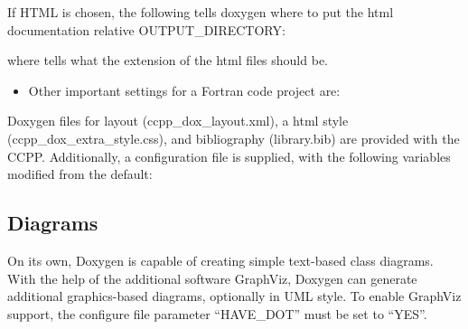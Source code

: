 \documentclass[letterpaper,10pt,english]{sphinxmanual}
\begin{document}
\begin{sphinxVerbatim}[commandchars=\\\{\}]
\end{sphinxVerbatim}

If HTML is chosen, the following tells doxygen where to put the html documentation
relative OUTPUT\_DIRECTORY:

\begin{sphinxVerbatim}[commandchars=\\\{\}]
\end{sphinxVerbatim}

where  tells what the extension of the html files should be.
\begin{itemize}
\item {} 
Other important settings for a Fortran code project are:

\end{itemize}

\begin{sphinxVerbatim}[commandchars=\\\{\}]
\end{sphinxVerbatim}

Doxygen files for layout (ccpp\_dox\_layout.xml), a html style (ccpp\_dox\_extra\_style.css),
and bibliography (library.bib) are provided with the CCPP. Additionally, a
configuration file is supplied, with the following variables modified from the default:


\subsection{Diagrams}
\label{\detokenize{ScientificDocRules:diagrams}}
On its own, Doxygen is capable of creating simple text-based class diagrams.
With the help of the additional software GraphViz, Doxygen can generate
additional graphics-based diagrams, optionally in UML style. To enable
GraphViz support, the configure file parameter “HAVE\_DOT” must be set to “YES”.
\end{document}
